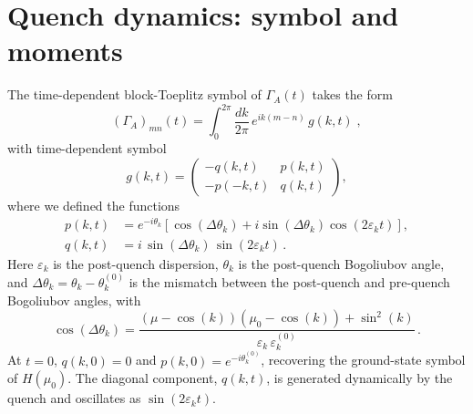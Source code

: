 \documentclass[aps,prl,twocolumn,superscriptaddress,reprint,longbibliography,nofootinbib]{revtex4-2}
\begin{document}
\section{Quench dynamics: symbol and moments}
\label{app:quench}
The time-dependent block-Toeplitz symbol of $\Gamma_A(t)$ takes the form~\cite{Calabrese2005evolution}
\begin{equation}
    (\Gamma_A)_{mn}(t) = \int_0^{2\pi}\!\frac{dk}{2\pi}\,e^{ik(m-n)}\,g(k,t)\;,\label{eq:mustang}
\end{equation}
with time-dependent symbol
\begin{equation}
    g(k,t) = \begin{pmatrix} -q(k,t) & p(k,t) \\ -p(-k,t) & q(k,t) \end{pmatrix},
    \label{eq:symbol_t}
\end{equation}
where we defined the functions
\begin{equation}
\begin{split}
    p(k,t) &= e^{-i\theta_k}\left[\cos(\Delta\theta_k) + i\sin(\Delta\theta_k)\cos (2\varepsilon_k t) \right], \\
    q(k,t) &= i\,\sin(\Delta\theta_k)\,\sin (2\varepsilon_k t)\,.
    \label{eq:pq_symbol}
\end{split}
\end{equation}
Here $\varepsilon_k $ is the post-quench dispersion, $\theta_k$ is the post-quench Bogoliubov angle, and $\Delta\theta_k = \theta_k - \theta_k^{(0)}$ is the mismatch between the post-quench and pre-quench Bogoliubov angles, with
\begin{equation}
    \cos(\Delta\theta_k) = \frac{(\mu-\cos(k))(\mu_0-\cos (k))+\sin^2 (k)}{\varepsilon_k\,\varepsilon_k^{(0)}}\,.
    \label{eq:cos_delta_theta}
\end{equation}
At $t=0$, $q(k,0) = 0$ and $p(k,0) = e^{-i\theta_k^{(0)}}$, recovering the ground-state symbol of $H(\mu_0)$.
The diagonal component, $q(k,t)$, is generated dynamically by the quench and oscillates as $\sin(2\varepsilon_k t)$.
\end{document}
